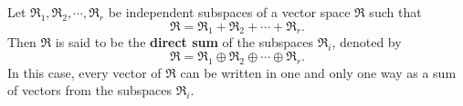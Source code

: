 Let $\mathfrak{R}_1, \mathfrak{R}_2, \cdots, \mathfrak{R}_r$ be independent subspaces of a vector space $\mathfrak{R}$ such that
$$
\mathfrak{R} = \mathfrak{R}_1 + \mathfrak{R}_2 + \cdots + \mathfrak{R}_r.
$$
Then $\mathfrak{R}$ is said to be the \textbf{direct sum} of the subspaces $\mathfrak{R}_i$, denoted by
$$
\mathfrak{R} = \mathfrak{R}_1 \oplus \mathfrak{R}_2 \oplus \cdots \oplus \mathfrak{R}_r.
$$
In this case, every vector of $\mathfrak{R}$ can be written in one and only one way as a sum of vectors from the subspaces $\mathfrak{R}_i$.
